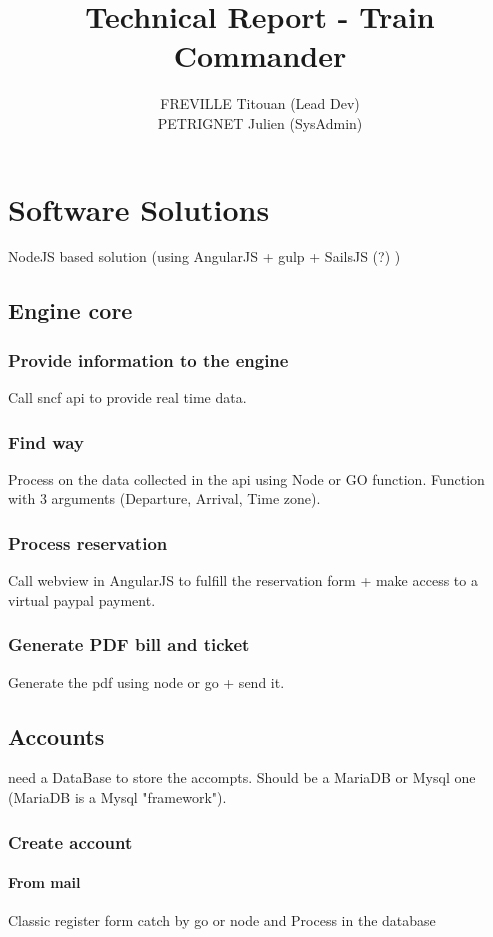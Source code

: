 \documentclass[a4paper,10pt]{report}
\title{Technical Report - Train Commander}
\author{
  FREVILLE Titouan (Lead Dev) \\
  PETRIGNET Julien (SysAdmin)
}
\begin{document}
\maketitle
\tableofcontents
\begin{abstract}
\end{abstract}

\part{Software Solutions}
  NodeJS based solution (using AngularJS + gulp + SailsJS (?) )
  \chapter{Engine core}
    \section{Provide information to the engine}
      Call sncf api to provide real time data.
    \section{Find way}
      Process on the data collected in the api using Node or GO function. Function with 3 arguments (Departure, Arrival, Time zone).
    \section{Process reservation}
      Call webview in AngularJS to fulfill the reservation form + make access to a virtual paypal payment.
    \section{Generate PDF bill and ticket}
      Generate the pdf using node or go + send it.
      
  \chapter{Accounts}
    need a DataBase to store the accompts. Should be a MariaDB or Mysql one (MariaDB is a Mysql "framework").
    \section{Create account}
      \subsection{From mail}
	Classic register form catch by go or node and Process in the database
\end{document}

